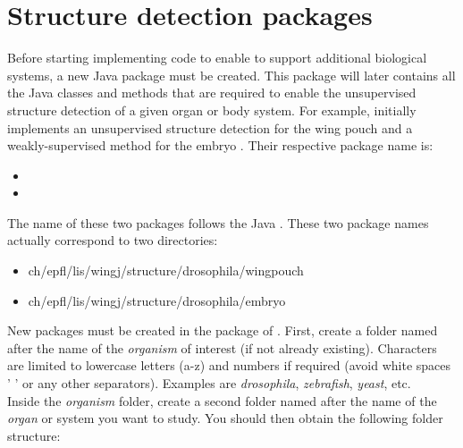 \section{Structure detection packages}
Before starting implementing code to enable \wingj to support additional biological systems, a new Java package must be created. This package will later contains all the Java classes and methods that are required to enable the unsupervised structure detection of a given organ or body system. For example, \wingj initially implements an unsupervised structure detection for the \droso wing pouch and a weakly-supervised method for the \droso embryo \autocite{schaffter2013}. Their respective package name is:


\begin{itemize}
 \item \wingpouchLongPkg
 \item \embryoLongPkg
\end{itemize}

The name of these two packages follows the Java \javaNamingConventions. These two package names actually correspond to two directories:

\begin{itemize}
 \item ch/epfl/lis/wingj/structure/drosophila/wingpouch
 \item ch/epfl/lis/wingj/structure/drosophila/embryo
\end{itemize}

New packages must be created in the \structurePkg package of \wingj. First, create a folder named after the name of the \textit{organism} of interest (if not already existing). Characters are limited to lowercase letters (a-z) and numbers if required (avoid white spaces ' ' or any other separators). Examples are \textit{drosophila}, \textit{zebrafish}, \textit{yeast}, etc.\\

Inside the \textit{organism} folder, create a second folder named after the name of the \textit{organ} or system you want to study. You should then obtain the following folder structure:

